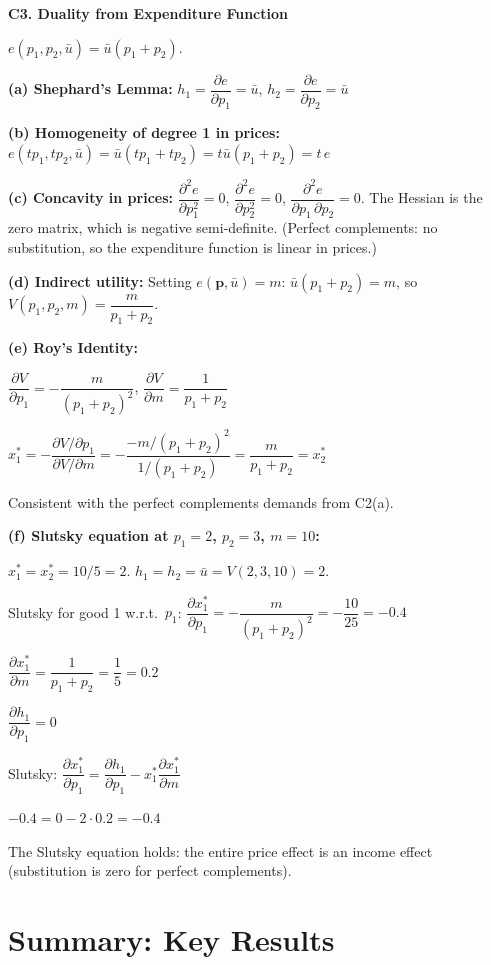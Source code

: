 \documentclass[12pt, a4paper]{article}
\theoremstyle{definition}
\newcommand{\bp}{\mathbf{p}}
\newcommand{\pp}[2]{\dfrac{\partial #1}{\partial #2}}
\newcommand{\ppp}[2]{\dfrac{\partial^{2} #1}{\partial #2^{2}}}
\newcommand{\ppmix}[3]{\dfrac{\partial^{2} #1}{\partial #2\,\partial #3}}
\begin{document}
\begin{solbox}
\textbf{C3. Duality from Expenditure Function}

$e(p_1,p_2,\bar u) = \bar u(p_1+p_2)$.

\textbf{(a) Shephard's Lemma:}
$h_1 = \pp{e}{p_1} = \bar u$, \quad $h_2 = \pp{e}{p_2} = \bar u$

\textbf{(b) Homogeneity of degree 1 in prices:}
$e(tp_1,tp_2,\bar u) = \bar u(tp_1+tp_2) = t\bar u(p_1+p_2) = t\,e$ \checkmark

\textbf{(c) Concavity in prices:}
$\ppp{e}{p_1} = 0$, $\ppp{e}{p_2}=0$, $\ppmix{e}{p_1}{p_2}=0$.
The Hessian is the zero matrix, which is negative semi-definite. \checkmark
(Perfect complements: no substitution, so the expenditure function is linear in prices.)

\textbf{(d) Indirect utility:}
Setting $e(\bp,\bar u)=m$: $\bar u(p_1+p_2)=m$, so $V(p_1,p_2,m) = \dfrac{m}{p_1+p_2}$.

\textbf{(e) Roy's Identity:}

$\pp{V}{p_1} = -\dfrac{m}{(p_1+p_2)^2}$, \quad
$\pp{V}{m} = \dfrac{1}{p_1+p_2}$

$x_1^* = -\dfrac{\partial V/\partial p_1}{\partial V/\partial m}
= -\dfrac{-m/(p_1+p_2)^2}{1/(p_1+p_2)}
= \dfrac{m}{p_1+p_2} = x_2^*$ \checkmark

Consistent with the perfect complements demands from C2(a). \checkmark

\textbf{(f) Slutsky equation at $p_1=2$, $p_2=3$, $m=10$:}

$x_1^*=x_2^*=10/5=2$. $h_1=h_2=\bar u=V(2,3,10)=2$.

Slutsky for good 1 w.r.t.\ $p_1$:
$\pp{x_1^*}{p_1} = -\dfrac{m}{(p_1+p_2)^2} = -\dfrac{10}{25} = -0.4$

$\pp{x_1^*}{m} = \dfrac{1}{p_1+p_2} = \dfrac{1}{5} = 0.2$

$\pp{h_1}{p_1} = 0$

Slutsky: $\pp{x_1^*}{p_1} = \pp{h_1}{p_1} - x_1^*\pp{x_1^*}{m}$

$-0.4 = 0 - 2\cdot 0.2 = -0.4$ \checkmark

The Slutsky equation holds: the entire price effect is an income effect (substitution is zero for perfect complements).
\end{solbox}

\section*{Summary: Key Results}
\end{document}
